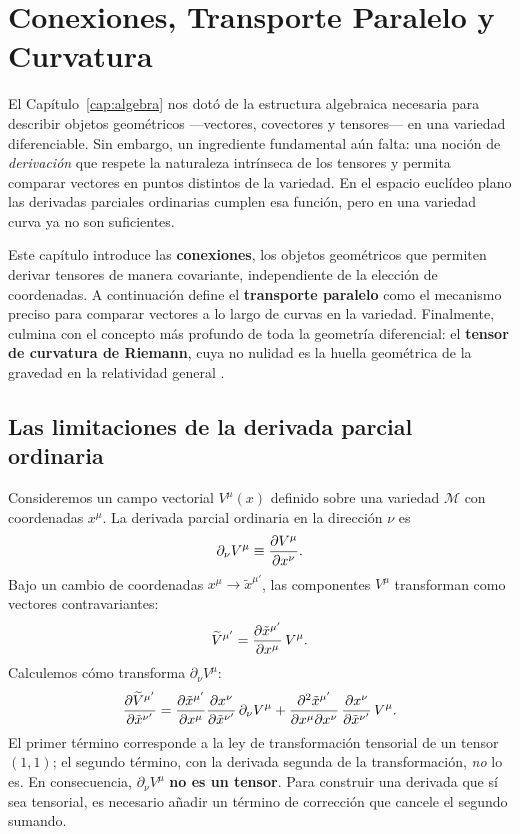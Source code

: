 
\chapter{Conexiones, Transporte Paralelo y Curvatura}
\label{cap:curvatura}

El Capítulo~\ref{cap:algebra} nos dotó de la estructura algebraica necesaria para describir objetos geométricos ---vectores, covectores y tensores--- en una variedad diferenciable. Sin embargo, un ingrediente fundamental aún falta: una noción de \emph{derivación} que respete la naturaleza intrínseca de los tensores y permita comparar vectores en puntos distintos de la variedad. En el espacio euclídeo plano las derivadas parciales ordinarias cumplen esa función, pero en una variedad curva ya no son suficientes.

Este capítulo introduce las \textbf{conexiones}, los objetos geométricos que permiten derivar tensores de manera covariante, independiente de la elección de coordenadas. A continuación define el \textbf{transporte paralelo} como el mecanismo preciso para comparar vectores a lo largo de curvas en la variedad. Finalmente, culmina con el concepto más profundo de toda la geometría diferencial: el \textbf{tensor de curvatura de Riemann}, cuya no nulidad es la huella geométrica de la gravedad en la relatividad general \cite{Carroll2004, Wald1984, Misner1973}.

\section{Las limitaciones de la derivada parcial ordinaria}

Consideremos un campo vectorial $V^\mu(x)$ definido sobre una variedad $\mathcal{M}$ con coordenadas $x^\mu$. La derivada parcial ordinaria en la dirección $\nu$ es
\[
  \partial_\nu V^\mu \equiv \dfrac{\partial V^\mu}{\partial x^\nu}.
\]
Bajo un cambio de coordenadas $x^\mu \to \tilde{x}^{\mu'}$, las componentes $V^\mu$ transforman como vectores contravariantes:
\[
  \widetilde{V}^{\mu'} = \dfrac{\partial \tilde{x}^{\mu'}}{\partial x^\mu}\, V^\mu.
\]
Calculemos cómo transforma $\partial_\nu V^\mu$:
\[
  \dfrac{\partial \widetilde{V}^{\mu'}}{\partial \tilde{x}^{\nu'}}
  = \dfrac{\partial \tilde{x}^{\mu'}}{\partial x^\mu}\dfrac{\partial x^\nu}{\partial \tilde{x}^{\nu'}}\,\partial_\nu V^\mu
    + \frac{\partial^2 \tilde{x}^{\mu'}}{\partial x^\mu \partial x^\nu}\,
      \dfrac{\partial x^\nu}{\partial \tilde{x}^{\nu'}}\, V^\mu.
\]
El primer término corresponde a la ley de transformación tensorial de un tensor $(1,1)$; el segundo término, con la derivada segunda de la transformación, \emph{no} lo es. En consecuencia, $\partial_\nu V^\mu$ \textbf{no es un tensor}. Para construir una derivada que sí sea tensorial, es necesario añadir un término de corrección que cancele el segundo sumando.

